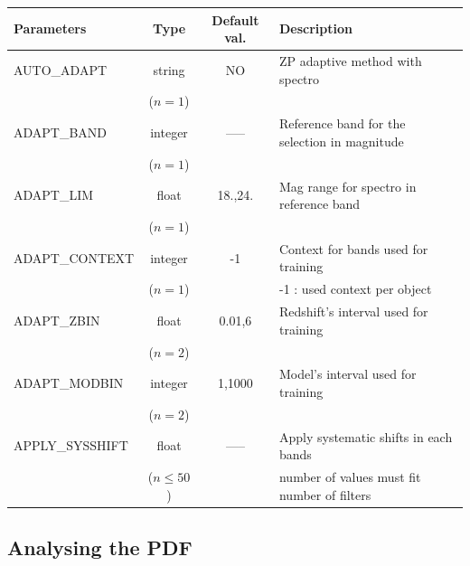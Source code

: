 \documentclass[12pt]{article}
\begin{document}
\begin{tabular}{lccl}
\\[0.5cm]
\textbf{Parameters}     & \textbf{Type}    & \textbf{Default val.} &  \textbf{Description}                                             \\[5pt]
\hline
AUTO\_ADAPT         & string   &   NO  &   ZP adaptive  method with spectro  \\
                                 & ($n=1$)&          &             \\
%
ADAPT\_BAND         & integer &  -----  &  Reference band for the selection in magnitude  \\ 
                                 & ($n=1$)&         &             \\
%
ADAPT\_LIM            & float       & 18.,24.& Mag range for spectro in reference band  \\
                                & ($n=1$)  &           &             \\
%
ADAPT\_CONTEXT  & integer   &  -1      &   Context for bands used for training \\
                                 & ($n=1$)  &           &   -1 : used context per object          \\
%                                 
ADAPT\_ZBIN          &  float       & 0.01,6 &    Redshift's interval used for training  \\
                                & ($n=2$)   &            &             \\
%
ADAPT\_MODBIN   & integer    &  1,1000 &  Model's interval used for training  \\
                                & ($n=2$)   &               &             \\
%
%
APPLY\_SYSSHIFT & float          &  ----- &  Apply systematic shifts in each bands               \\
                                &  ($n\le 50$)&           & number of values must fit number of filters             \\ 
\hline
\hline
\end{tabular}



\subsection{Analysing the PDF} 
\end{document}
